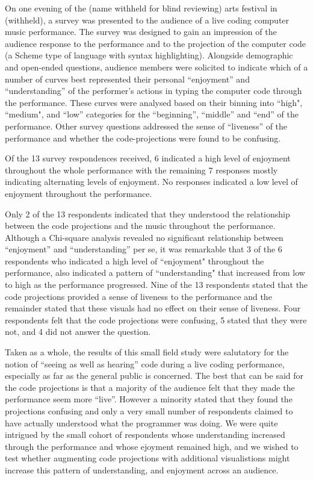 \documentclass{sig-alternate}
\begin{document}
On one evening of the (name withheld for blind reviewing) arts festival in (withheld), a survey was presented to the audience of a live coding computer music performance. The survey was designed to gain an impression of the audience response to the performance and to the projection of the computer code (a Scheme type of language with syntax highlighting). Alongside demographic and open-ended questions, audience members were solicited to indicate which of a number of curves best represented their personal ``enjoyment'' and ``understanding'' of the performer's actions in typing the computer code through the performance. These curves were analysed based on their binning into ``high", ``medium", and ``low'' categories for the ``beginning'', ``middle'' and ``end'' of the performance. Other survey questions addressed the sense of ``liveness'' of the performance \cite{Auslander} and whether the code-projections were found to be confusing.

Of the 13 survey respondences received, 6 indicated a high level of enjoyment throughout the whole performance with the remaining 7 responses mostly indicating alternating levels of enjoyment. No responses indicated a low level of enjoyment throughout the performance.

Only 2 of the 13 respondents indicated that they understood the relationship between the code projections and the music throughout the performance. Although a Chi-square analysis revealed no significant relationship between ``enjoyment'' and ``understanding'' per se, it was remarkable that 3 of the 6 respondents who indicated a high level of ``enjoyment" throughout the performance, also indicated a pattern of ``understanding" that increased from low to high as the performance progressed. Nine of the 13 respondents stated that the code projections provided a sense of liveness to the performance and the remainder stated that these visuals had no effect on their sense of liveness. Four respondents felt that the code projections were confusing, 5 stated that they were not, and 4 did not answer the question.

Taken as a whole, the results of this small field study were salutatory for the notion of ``seeing as well as hearing'' code during a live coding performance, especially as far as the general public is concerned. The best that can be said for the code projections is that a majority of the audience felt that they made the performance seem more ``live''. However a minority stated that they found the projections confusing and only a very small number of respondents claimed to have actually understood what the programmer was doing. We were quite intrigued by the small cohort of respondents whose understanding increased through the performance and whose ejoyment remained high, and we wished to test whether augmenting code projections with additional visualistions might increase this pattern of understanding, and enjoyment across an audience. 
\end{document}
